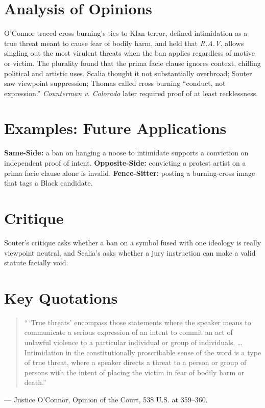 \documentclass[12pt]{article}
\begin{document}
\section{Analysis of Opinions}
O'Connor traced cross burning's ties to Klan terror, defined intimidation as a true threat meant to cause fear of bodily harm, and held that \textit{R.A.V.} allows singling out the most virulent threats when the ban applies regardless of motive or victim. The plurality found that the prima facie clause ignores context, chilling political and artistic uses. Scalia thought it not substantially overbroad; Souter saw viewpoint suppression; Thomas called cross burning ``conduct, not expression.'' \textit{Counterman v. Colorado} later required proof of at least recklessness.

\section{Examples: Future Applications}
\textbf{Same-Side:} a ban on hanging a noose to intimidate supports a conviction on independent proof of intent. \textbf{Opposite-Side:} convicting a protest artist on a prima facie clause alone is invalid. \textbf{Fence-Sitter:} posting a burning-cross image that tags a Black candidate.

\section{Critique}
Souter's critique asks whether a ban on a symbol fused with one ideology is really viewpoint neutral, and Scalia's asks whether a jury instruction can make a valid statute facially void.

\section{Key Quotations}
\begin{quote}
``\,`True threats' encompass those statements where the speaker means to communicate a serious expression of an intent to commit an act of unlawful violence to a particular individual or group of individuals. \dots Intimidation in the constitutionally proscribable sense of the word is a type of true threat, where a speaker directs a threat to a person or group of persons with the intent of placing the victim in fear of bodily harm or death.''
\end{quote}
\noindent --- Justice O'Connor, Opinion of the Court, 538 U.S. at 359--360.
\end{document}
